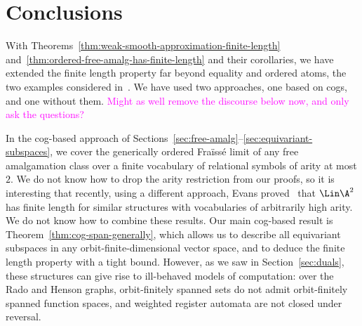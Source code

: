 \section{Conclusions}
With Theorems~\ref{thm:weak-smooth-approximation-finite-length} and~\ref{thm:ordered-free-amalg-has-finite-length} and their corollaries, we have extended the finite length property far beyond equality and ordered atoms, the two examples considered in~\cite{BFKM24}. 
We have used two approaches, one based on cogs, and one without them.
\textcolor{magenta}{Might as well remove the discourse below now, and only ask the questions?}


 In the cog-based approach of Sections~\ref{sec:free-amalg}--\ref{sec:equivariant-subspaces}, we cover the generically ordered Fraïssé limit of any free amalgamation class over a finite vocabulary of relational symbols of arity at most $2$. We do not know how to drop the arity restriction from our proofs, so it is interesting that recently, using a different approach, Evans proved~\cite[Prop.~3.10]{Evans_pm1} that $\Lin \A^2$ has finite length for similar structures with  vocabularies of arbitrarily high arity. We do not know how to combine these results. 
Our main cog-based result is Theorem~\ref{thm:cog-span-generally}, 
which allows us to describe all equivariant subspaces in any orbit-finite-dimensional vector space, and to deduce the finite length property with a tight bound.
However, as we saw in Section~\ref{sec:duals}, these structures can give rise to ill-behaved models of computation:
over the Rado and Henson graphs, orbit-finitely spanned sets do not admit orbit-finitely spanned function spaces, and weighted register automata are not closed under reversal.


